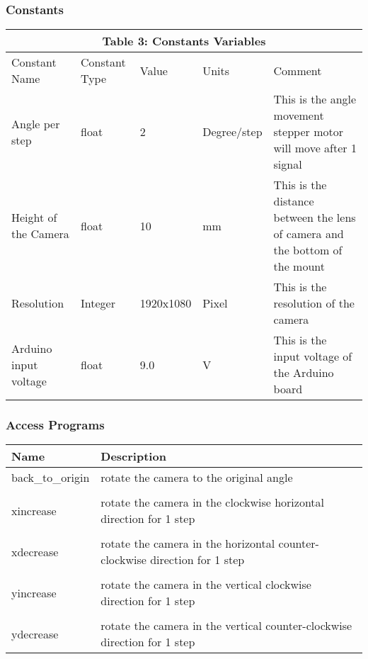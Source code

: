 \documentclass[12pt, titlepage]{article}
\begin{document}
\subsubsection{Constants}
\begin{tabular}{|p{}|p{}|p{}|p{}|p{}|}

\hline \multicolumn{5}{|c|}{Table 3: Constants Variables}\\

\hline Constant Name&Constant Type&Value&Units &Comment\\

\hline Angle per step&float&2&Degree/step&This is the angle movement stepper motor will move after 1 signal \\

\hline Height of the Camera&float&10&mm&This is the distance between the lens of camera and the bottom of the mount\\

\hline Resolution&Integer&1920x1080&Pixel&This is the resolution of the camera\\
\hline Arduino input voltage&float&9.0&V&This is the input voltage of the Arduino board\\


\hline

\end{tabular}


\subsubsection{Access Programs}


\begin{center}
\begin{tabular}{p{4cm} p{8cm} }
\hline
\textbf{Name} & \textbf{Description}  \\
\hline
back\_to\_origin & rotate the camera to the original angle  \\\\

xincrease & rotate the camera in the clockwise horizontal direction for 1 step \\\\

xdecrease & rotate the camera in the horizontal counter-clockwise direction for 1 step \\\\


yincrease & rotate the camera in the vertical clockwise direction for 1 step  \\\\


ydecrease & rotate the camera in the vertical counter-clockwise direction for 1 step  \\




\end{tabular}
\end{center}
\end{document}

